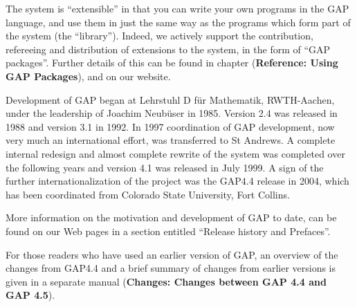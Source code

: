 \documentclass[a4paper,11pt]{report}
\begin{document}
{{ The system is ``extensible'' in that you can write your own programs in the \textsf{GAP} language, and use them in just the same way as the programs which form part of
the system (the ``library''). Indeed, we actively support the contribution, refereeing and distribution
of extensions to the system, in the form of ``\textsf{GAP} packages''. Further details of this can be found in chapter  (\textbf{Reference: Using GAP Packages}), and on our website. 

 Development of \textsf{GAP} began at Lehrstuhl D f{\"u}r Mathematik, RWTH-Aachen, under the leadership of
Joachim Neub{\"u}ser in 1985. Version 2.4 was released in 1988 and version 3.1
in 1992. In 1997 coordination of \textsf{GAP} development, now very much an international effort, was transferred to St
Andrews. A complete internal redesign and almost complete rewrite of the
system was completed over the following years and version 4.1 was released in
July 1999. A sign of the further internationalization of the project was the \textsf{GAP}{\nobreakspace}4.4 release in 2004, which has been coordinated from Colorado
State University, Fort Collins. 

 More information on the motivation and development of \textsf{GAP} to date, can be found on our Web pages in a section entitled ``Release history and Prefaces''. 

 For those readers who have used an earlier version of \textsf{GAP}, an overview of the changes from \textsf{GAP}{\nobreakspace}4.4 and a brief summary of changes from earlier versions is
given in a separate manual  (\textbf{Changes: Changes between GAP 4.4 and GAP 4.5}). 

}}
\end{document}
